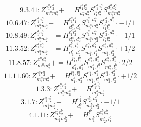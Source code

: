 \documentclass[letterpaper,10pt,fleqn,leqno,onecolumn]{article}
\begin{document}
\begin{equation} \;\;\;\;\;\;  9.3.41: Z^{e_{1}^{a}e_{2}^{a}}_{m_{1}^{a}m_{2}^{a}}+=H^{l_{1}^{a}l_{2}^{a}}_{d_{1}^{a}d_{2}^{a}}S^{e_{1}^{a}e_{2}^{a}}_{l_{1}^{a}l_{2}^{a}}S^{d_{1}^{a}d_{2}^{a}}_{m_{1}^{a}m_{2}^{a}} \end{equation}
\begin{equation} \;\;\;\;\;\;  10.6.47: Z^{e_{1}^{a}e_{2}^{a}}_{m_{1}^{a}m_{2}^{a}}+=H^{l_{1}^{a}l_{1}^{b}}_{d_{1}^{a},d_{1}^{b}}S^{e_{1}^{a},d_{1}^{a}}_{m_{1}^{a}m_{2}^{a}}S^{e_{2}^{a},d_{1}^{b}}_{l_{1}^{a}l_{1}^{b}}\cdot -1/1 \end{equation}
\begin{equation} \;\;\;\;\;\;  10.8.49: Z^{e_{1}^{a}e_{2}^{a}}_{m_{1}^{a}m_{2}^{a}}+=H^{l_{1}^{a}l_{2}^{a}}_{d_{1}^{a},d_{2}^{a}}S^{e_{1}^{a},d_{1}^{a}}_{m_{1}^{a}m_{2}^{a}}S^{e_{2}^{a},d_{2}^{a}}_{l_{1}^{a}l_{2}^{a}}\cdot -1/1 \end{equation}
\begin{equation} \;\;\;\;\;\;  11.3.52: Z^{e_{1}^{a}e_{2}^{a}}_{m_{1}^{a}m_{2}^{a}}+=H^{l_{1}^{b},l_{2}^{b}}_{d_{1}^{b},d_{2}^{b}}S^{e_{1}^{a},d_{1}^{b}}_{m_{1}^{a},l_{1}^{b}}S^{e_{2}^{a},d_{2}^{b}}_{m_{2}^{a},l_{2}^{b}}\cdot +1/2 \end{equation}
\begin{equation} \;\;\;\;\;\;  11.8.57: Z^{e_{1}^{a}e_{2}^{a}}_{m_{1}^{a}m_{2}^{a}}+=H^{l_{1}^{a},l_{1}^{b}}_{d_{1}^{a},d_{1}^{b}}S^{e_{1}^{a},d_{1}^{a}}_{m_{1}^{a},l_{1}^{a}}S^{e_{2}^{a},d_{1}^{b}}_{m_{2}^{a},l_{1}^{b}}\cdot 2/2 \end{equation}
\begin{equation} \;\;\;\;\;\;  11.11.60: Z^{e_{1}^{a}e_{2}^{a}}_{m_{1}^{a}m_{2}^{a}}+=H^{l_{1}^{a},l_{2}^{a}}_{d_{1}^{a},d_{2}^{a}}S^{e_{1}^{a},d_{1}^{a}}_{m_{1}^{a},l_{1}^{a}}S^{e_{2}^{a},d_{2}^{a}}_{m_{2}^{a},l_{2}^{a}}\cdot +1/2 \end{equation}
\begin{equation} \;\;\;\;\;\;  1.3.3: Z^{e_{1}^{b}e_{2}^{b}}_{m_{1}^{b}m_{2}^{b}}+=H^{e_{1}^{b}e_{2}^{b}}_{m_{1}^{b}m_{2}^{b}} \end{equation}
\begin{equation} \;\;\;\;\;\;  3.1.7: Z^{e_{1}^{b}e_{2}^{b}}_{m_{1}^{b}m_{2}^{b}}+=H^{e_{1}^{b}}_{d_{1}^{b}}S^{e_{2}^{b},d_{1}^{b}}_{m_{1}^{b}m_{2}^{b}}\cdot -1/1 \end{equation}
\begin{equation} \;\;\;\;\;\;  4.1.11: Z^{e_{1}^{b}e_{2}^{b}}_{m_{1}^{b}m_{2}^{b}}+=H^{l_{1}^{b}}_{m_{1}^{b}}S^{e_{1}^{b}e_{2}^{b}}_{m_{2}^{b},l_{1}^{b}} \end{equation}
\end{document}

